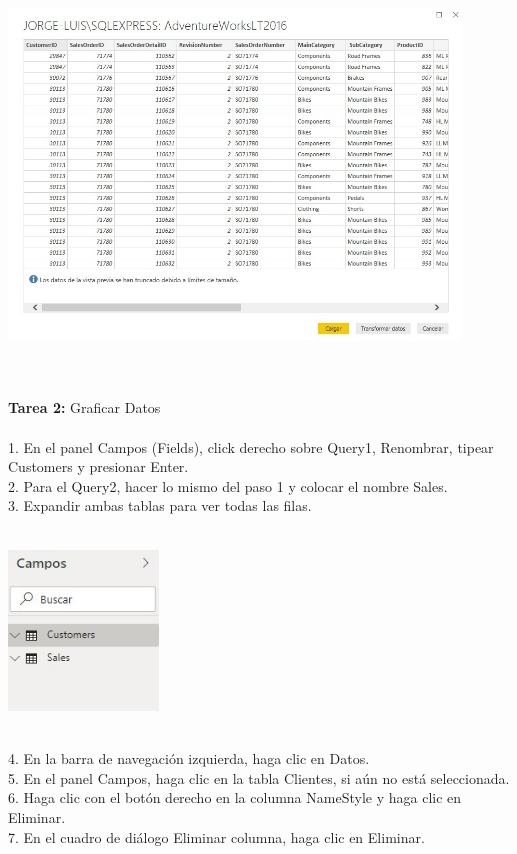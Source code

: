 \begin{flushleft}
\begin{itemize}
\begin{center}
	\end{center}
\textbf{ }\\
\textbf{ }\\
\begin{center}
	\includegraphics[width=12cm]{./Imagenes/image7} 
	\end{center}
\textbf{ }\\

\textbf{ }\\
\textbf{Tarea 2: }Graficar Datos  \\
\textbf{ }\\

1. En el panel Campos (Fields), click derecho sobre Query1, Renombrar, tipear Customers y presionar Enter.\\
2. Para el Query2, hacer lo mismo del paso 1 y colocar el nombre Sales.\\
3. Expandir ambas tablas para ver todas las filas.\\
\textbf{ }\\
\begin{center}
	\includegraphics[width=4cm]{./Imagenes/image8} 
	\end{center}
\textbf{ }\\
4. En la barra de navegación izquierda, haga clic en Datos.\\
5. En el panel Campos, haga clic en la tabla Clientes, si aún no está seleccionada.\\
6. Haga clic con el botón derecho en la columna NameStyle y haga clic en Eliminar.\\
7. En el cuadro de diálogo Eliminar columna, haga clic en Eliminar.\\


\end{itemize}
\end{flushleft}
